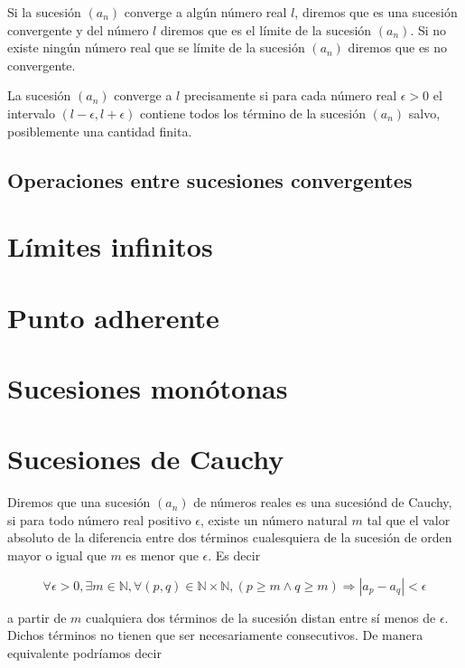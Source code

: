 Si la sucesión $(a_n)$ converge a algún número real $l$, diremos que es una sucesión 
convergente y del número $l$ diremos que es 
el límite de la sucesión $(a_n)$. Si no existe
ningún número real que se límite de la sucesión $(a_n)$ diremos que es 
no convergente.

La sucesión $(a_n)$ converge a $l$ precisamente si para cada número real $\epsilon>0$ el intervalo
$(l-\epsilon, l+\epsilon)$ contiene todos los término de la sucesión $(a_n)$ salvo, posiblemente una
cantidad finita.

\subsection{Operaciones entre sucesiones convergentes}

\section{Límites infinitos}
\section{Punto adherente}
\section{Sucesiones monótonas}

\section{Sucesiones de Cauchy}

Diremos que una sucesión $(a_n)$ de números reales es una sucesiónd de 
Cauchy, si para todo
número real positivo $\epsilon$, existe un número natural $m$ tal que el valor absoluto de la
diferencia entre dos términos cualesquiera de la sucesión de orden mayor o igual que $m$ es menor
que $\epsilon$. Es decir

\begin{equation}
	\forall \epsilon>0, \exists m\in\mathbb{N}, \forall(p,q)\in\mathbb{N}\times\mathbb{N},
	(p \geq m \wedge q \geq m)\Rightarrow |a_p-a_q|<\epsilon
\end{equation}

a partir de $m$ cualquiera dos términos de la sucesión distan entre sí menos de $\epsilon$. Dichos
términos no tienen que ser necesariamente consecutivos. De manera equivalente podríamos decir

